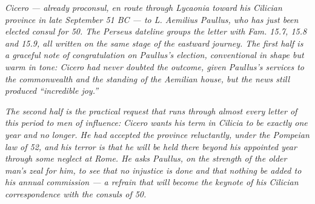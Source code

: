 
\textit{Cicero --- already proconsul, en route through Lycaonia toward
his Cilician province in late September 51 BC --- to L. Aemilius Paullus,
who has just been elected consul for 50. The Perseus dateline groups
the letter with \textit{Fam.} 15.7, 15.8 and 15.9, all written on the
same stage of the eastward journey. The first half is a graceful note
of congratulation on Paullus's election, conventional in shape but
warm in tone: Cicero had never doubted the outcome, given Paullus's
services to the commonwealth and the standing of the Aemilian house,
but the news still produced ``incredible joy.''}

\textit{The second half is the practical request that runs through
almost every letter of this period to men of influence: Cicero wants
his term in Cilicia to be exactly one year and no longer. He had
accepted the province reluctantly, under the Pompeian law of 52, and
his terror is that he will be held there beyond his appointed year
through some neglect at Rome. He asks Paullus, on the strength of the
older man's zeal for him, to see that no injustice is done and that
nothing be added to his annual commission --- a refrain that will
become the keynote of his Cilician correspondence with the consuls of
50.}
